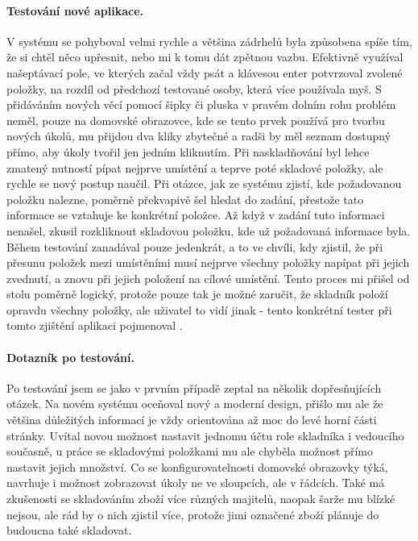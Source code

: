 \paragraph{Testování nové aplikace.} V systému se pohyboval velmi rychle a většina zádrhelů byla způsobena spíše tím, že si chtěl něco upřesnit, nebo mi k tomu dát zpětnou vazbu. Efektivně využíval našeptávací pole, ve kterých začal vždy psát a klávesou enter potvrzoval zvolené položky, na rozdíl od předchozí testované osoby, která více používala myš. S přidáváním nových věcí pomocí šipky či pluska v pravém dolním rohu problém neměl, pouze na domovské obrazovce, kde se tento prvek používá pro tvorbu nových úkolů, mu přijdou dva kliky zbytečné a radši by měl seznam dostupný přímo, aby úkoly tvořil jen jedním kliknutím. Při naskladňování byl lehce zmatený nutností pípat nejprve umístění a teprve poté skladové položky, ale rychle se nový postup naučil. Při otázce, jak ze systému zjistí, kde požadovanou položku nalezne, poměrně překvapivě šel hledat do zadání, přestože tato informace se vztahuje ke konkrétní položce. Až když v zadání tuto informaci nenašel, zkusil rozkliknout skladovou položku, kde už požadovaná informace byla. Během testování zanadával pouze jedenkrát, a to ve chvíli, kdy zjistil, že při přesunu položek mezi umístěními musí nejprve všechny položky napípat při jejich zvednutí, a znovu při jejich položení na cílové umístění. Tento proces mi přišel od stolu poměrně logický, protože pouze tak je možné zaručit, že skladník položí opravdu všechny položky, ale uživatel to vidí jinak - tento konkrétní tester při tomto zjištění aplikaci pojmenoval .

\paragraph{Dotazník po testování.} Po testování jsem se jako v prvním případě zeptal na několik dopřesňujících otázek. Na novém systému oceňoval nový a moderní design, přišlo mu ale že většina důležitých informací je vždy orientována až moc do levé horní části stránky. Uvítal novou možnost nastavit jednomu účtu role skladníka i vedoucího současně, u práce se skladovými položkami mu ale chyběla možnost přímo nastavit jejich množství. Co se konfigurovatelnosti domovské obrazovky týká, navrhuje i možnost zobrazovat úkoly ne ve sloupcích, ale v řádcích. Také má zkušenosti se skladováním zboží více různých majitelů, naopak šarže mu blízké nejsou, ale rád by o nich zjistil více, protože jimi označené zboží plánuje do budoucna také skladovat.

